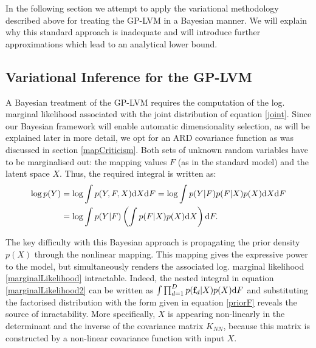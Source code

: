 In the following section we attempt to apply the variational methodology described above
for treating the GP-LVM in a Bayesian manner. We will
explain why this standard approach is inadequate
and will introduce further approximations which lead to an
analytical lower bound.


\subsection{\label{section:vgplvmBound} Variational Inference for the GP-LVM}

A Bayesian treatment of the GP-LVM requires the computation of the log. marginal likelihood
associated with the joint distribution of equation \eqref{joint}.
Since our Bayesian framework will enable automatic dimensionality selection, as will be
explained later in more detail, we opt for an ARD covariance function as was discussed
in section \ref{mapCriticism}.
Both sets of unknown
random variables have to be marginalised out: the mapping values $F$ (as in the standard model)
and the latent space $X$.
Thus, the required integral is written as:
\begin{align}
\log p(Y) &= \log \int p(Y, F, X) \text{d} X \text{d} F
                  =  \log \int p( Y | F) p(F | X ) p(X) \text{d}  X \text{d} F \label{marginalLikelihood} \\
              &= \log \int p(Y|F) \left( \int p(F|X) p(X) \text{d} X \right) \text{d} F \label{marginalLikelihood2}.
\end{align}



\noindent The key difficulty with this Bayesian approach is propagating the prior
density $p(X)$ through the nonlinear mapping. This
mapping gives the expressive power to the model, but simultaneously
renders the associated log. marginal likelihood \eqref{marginalLikelihood} intractable. 
Indeed, the nested integral in equation \eqref{marginalLikelihood2} can be written
as $\int \prod_{d=1}^D p(\mathbf{f}_d | X) p(X) \text{d} F$ and substituting the factorised distribution
with the form given in equation \eqref{priorF} reveals the source of inractability.
More specifically, $X$ is appearing non-linearly in the determinant and the inverse of the
covariance matrix $K_{NN}$, because this matrix is constructed by a non-linear covariance function
with input $X$. 

